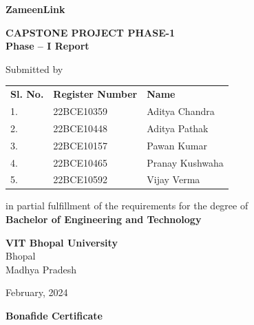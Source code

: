 \documentclass[12pt,a4paper]{report}
\begin{document}
\begin{titlepage}
    \centering
    \textbf{\Large ZameenLink}
    
    \vspace{1cm}
    
    \textbf{CAPSTONE PROJECT PHASE-1}\\
    \textbf{Phase – I Report}
    
    \vspace{1.5cm}
    
    Submitted by
    
    \vspace{0.5cm}
    
    \begin{tabular}{lll}
        \textbf{Sl. No.} & \textbf{Register Number} & \textbf{Name} \\
        1. & 22BCE10359 & Aditya Chandra \\
        2. & 22BCE10448 & Aditya Pathak \\
        3. & 22BCE10157 & Pawan Kumar \\
        4. & 22BCE10465 & Pranay Kushwaha \\
        5. & 22BCE10592 & Vijay Verma \\
    \end{tabular}
    
    \vspace{2cm}
    
    in partial fulfillment of the requirements for the degree of\\
    \textbf{Bachelor of Engineering and Technology}
    
    \vspace{2cm}
    
    {\Large \textbf{VIT Bhopal University}}\\
    Bhopal\\
    Madhya Pradesh
    
    \vspace{1.5cm}
    
    February, 2024
    
\end{titlepage}

\newpage
\thispagestyle{plain}
\begin{center}
    {\Large \textbf{Bonafide Certificate}}
\end{center}
\end{document}
